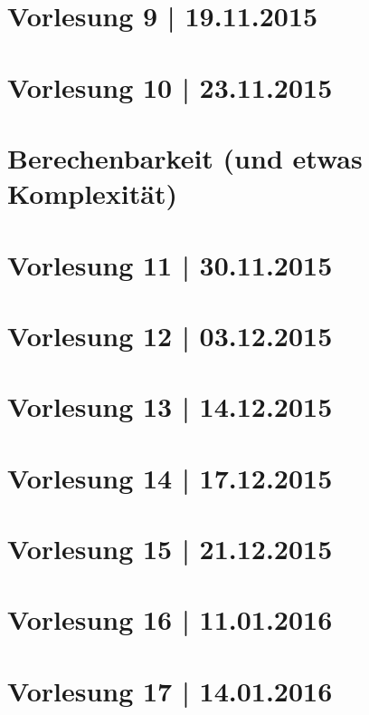 \newpage
\part*{Vorlesung 9 | 19.11.2015}

\newpage
\part*{Vorlesung 10 | 23.11.2015}


\newpage
\part[Berechenbarkeit]{Berechenbarkeit {\large (und etwas Komplexität)}}

\part*{Vorlesung 11 | 30.11.2015}

\newpage
\part*{Vorlesung 12 | 03.12.2015}


\newpage
\part*{Vorlesung 13 | 14.12.2015}

\newpage
\part*{Vorlesung 14 | 17.12.2015}

\newpage
\part*{Vorlesung 15 | 21.12.2015}


\newpage
\part*{Vorlesung 16 | 11.01.2016}

\newpage
\part*{Vorlesung 17 | 14.01.2016}

